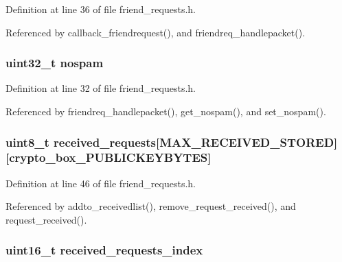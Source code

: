 Definition at line 36 of file friend\+\_\+requests.\+h.



Referenced by callback\+\_\+friendrequest(), and friendreq\+\_\+handlepacket().

\hypertarget{struct_friend___requests_a637ab08069536895c9a896c4ee9dcdf7}{
\subsubsection[{nospam}]{\setlength{\rightskip}{0pt plus 5cm}uint32\+\_\+t nospam}}\label{struct_friend___requests_a637ab08069536895c9a896c4ee9dcdf7}


Definition at line 32 of file friend\+\_\+requests.\+h.



Referenced by friendreq\+\_\+handlepacket(), get\+\_\+nospam(), and set\+\_\+nospam().

\hypertarget{struct_friend___requests_a68ddfbf4a697f40962f07c5608f394cf}{
\subsubsection[{received\+\_\+requests}]{\setlength{\rightskip}{0pt plus 5cm}uint8\+\_\+t received\+\_\+requests\mbox{[}{\bf M\+A\+X\+\_\+\+R\+E\+C\+E\+I\+V\+E\+D\+\_\+\+S\+T\+O\+R\+E\+D}\mbox{]}\mbox{[}crypto\+\_\+box\+\_\+\+P\+U\+B\+L\+I\+C\+K\+E\+Y\+B\+Y\+T\+E\+S\mbox{]}}}\label{struct_friend___requests_a68ddfbf4a697f40962f07c5608f394cf}


Definition at line 46 of file friend\+\_\+requests.\+h.



Referenced by addto\+\_\+receivedlist(), remove\+\_\+request\+\_\+received(), and request\+\_\+received().

\hypertarget{struct_friend___requests_a0e318c112b35d57bd44f5a47b9e3f680}{
\subsubsection[{received\+\_\+requests\+\_\+index}]{\setlength{\rightskip}{0pt plus 5cm}uint16\+\_\+t received\+\_\+requests\+\_\+index}}\label{struct_friend___requests_a0e318c112b35d57bd44f5a47b9e3f680}


